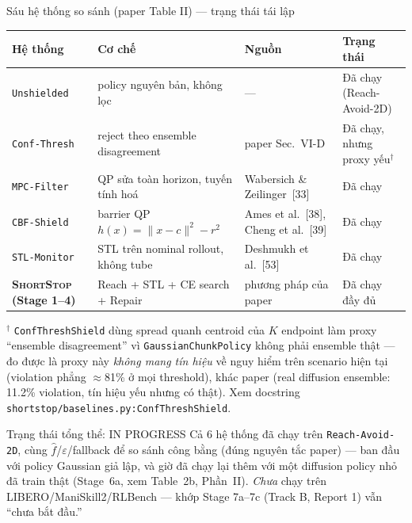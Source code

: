 \documentclass[aspectratio=169]{beamer}
\newcommand{\st}{\textsc{ShortStop}}
\newcommand{\good}[1]{\textcolor{green!40!black}{#1}}
\newcommand{\wip}[1]{\textcolor{orange!80!black}{#1}}
\begin{document}
\begin{frame}[t,shrink=8]{Sáu hệ thống so sánh (paper Table II) --- trạng thái tái lập}
\footnotesize
\begin{center}
\begin{tabular}{@{}l l l l@{}}
\toprule
\textbf{Hệ thống} & \textbf{Cơ chế} & \textbf{Nguồn} & \textbf{Trạng thái} \\
\midrule
\texttt{Unshielded} & policy nguyên bản, không lọc & --- & \good{Đã chạy} (Reach-Avoid-2D) \\
\texttt{Conf-Thresh} & reject theo ensemble disagreement & paper Sec.~VI-D & \wip{Đã chạy, nhưng proxy yếu}$^\dagger$ \\
\texttt{MPC-Filter} & QP sửa toàn horizon, tuyến tính hoá & Wabersich \& Zeilinger~[33] & \good{Đã chạy} \\
\texttt{CBF-Shield} & barrier QP $h(x)=\lVert x-c\rVert^2-r^2$ & Ames et al.~[38], Cheng et al.~[39] & \good{Đã chạy} \\
\texttt{STL-Monitor} & STL trên nominal rollout, không tube & Deshmukh et al.~[53] & \good{Đã chạy} \\
\textbf{\st{} (Stage 1--4)} & Reach + STL + CE search + Repair & phương pháp của paper & \good{Đã chạy đầy đủ} \\
\bottomrule
\end{tabular}
\end{center}
\vspace{6pt}
{\scriptsize $^\dagger$ \texttt{ConfThreshShield} dùng spread quanh centroid của $K$ endpoint làm proxy ``ensemble disagreement'' vì \texttt{GaussianChunkPolicy} không phải ensemble thật --- đo được là proxy này \emph{không mang tín hiệu} về nguy hiểm trên scenario hiện tại (violation phẳng $\approx$81\% ở mọi threshold), khác paper (real diffusion ensemble: 11.2\% violation, tín hiệu yếu nhưng có thật). Xem docstring \texttt{shortstop/baselines.py:ConfThreshShield}.}

\vspace{6pt}
\begin{alertblock}{Trạng thái tổng thể: \wip{IN PROGRESS}}
Cả 6 hệ thống đã chạy trên \texttt{Reach-Avoid-2D}, cùng $\hat f$/$\varepsilon$/fallback để so sánh công bằng (đúng nguyên tắc paper) --- ban đầu với policy Gaussian giả lập, và giờ \good{đã chạy lại thêm} với một diffusion policy nhỏ đã train thật (Stage~6a, xem Table~2b, Phần~II). \emph{Chưa} chạy trên LIBERO/ManiSkill2/RLBench --- khớp Stage 7a--7c (Track B, Report 1) vẫn ``chưa bắt đầu.''
\end{alertblock}
\end{frame}
\end{document}
